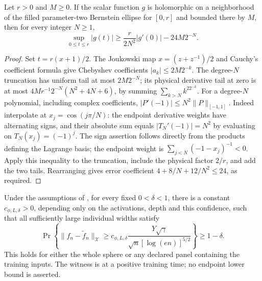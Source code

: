 \begin{lemma}
\label{cp:derivative-transfer}
Let $r>0$ and $M\ge0$. If the scalar function $g$ is holomorphic on a
neighborhood of the filled parameter-two
Bernstein ellipse for $[0,r]$ and bounded there by $M$, then for every
integer $N\ge1$,
\begin{equation}
 \sup_{0\le t\le r}|g(t)|
       \ge\frac r{2N^2}|g'(0)|-24M2^{-N}.
 \label{cp:eq-derivative-transfer}
\end{equation}
\end{lemma}
\begin{proof}
Set $t=r(x+1)/2$.  The Joukowski map
$x=(z+z^{-1})/2$ and Cauchy's coefficient formula give Chebyshev
coefficients $|a_k|\le2M2^{-k}$.  The degree-$N$ truncation has
uniform tail at most $2M2^{-N}$; its physical derivative tail at zero
is at most
$4M r^{-1}2^{-N}(N^2+4N+6)$, by summing
$\sum_{k>N}k^22^{-k}$.
For a degree-$N$ polynomial, including complex coefficients,
$|P'(-1)|\le N^2\|P\|_{[-1,1]}$.
Indeed interpolate at $x_j=\cos(j\pi/N)$: the endpoint derivative
weights have alternating signs, and their absolute sum equals
$|T_N'(-1)|=N^2$ by evaluating on $T_N(x_j)=(-1)^j$.
The sign assertion follows directly from the products defining the
Lagrange basis; the endpoint weight is
$\sum_{j<N}(-1-x_j)^{-1}<0$.
Apply this inequality to the truncation, include the physical factor
$2/r$, and add the two tails.  Rearranging gives error coefficient
$4+8/N+12/N^2\le24$, as required.
\end{proof}

\begin{proposition}
\label{cp:dense-lower}
Under the assumptions of , for every fixed $0<\delta<1$,
there is a constant
$c_{\phi,L,\delta}>0$, depending only on the activations, depth and
this confidence, such that all sufficiently large individual widths satisfy
\begin{equation}
 \Pr\left\{\|f_n-\widetilde f_n\|_{\mathcal X}
       \ge c_{\phi,L,\delta}\frac{Y\sqrt\gamma}
              {\sqrt n[\log(en)]^{5/2}}\right\}\ge1-\delta.
 \label{cp:eq-dense-lower}
\end{equation}
This holds for either the whole sphere or any declared panel containing
the training inputs.  The witness is at a positive training time;
no endpoint lower bound is asserted.
\end{proposition}

